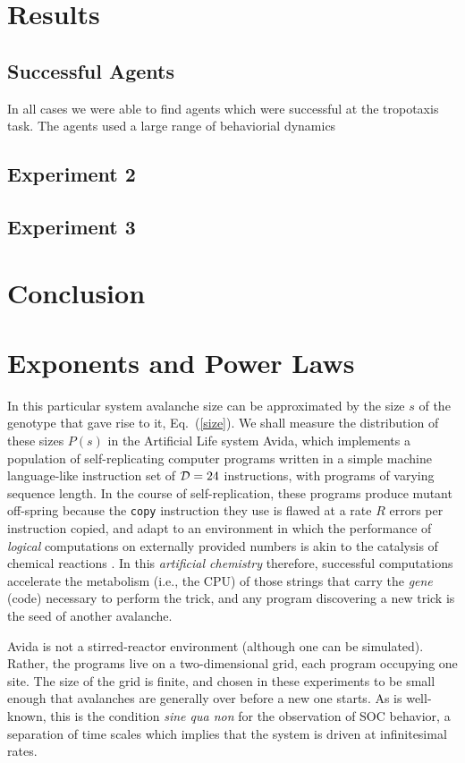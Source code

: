 \documentclass[letterpaper]{article}
\begin{document}
\section{Results}
\subsection{Successful Agents}
In all cases we were able to find agents which were successful at the tropotaxis
task. The agents used a large range of behaviorial dynamics

\subsection{Experiment 2}
\subsection{Experiment 3}

\section{Conclusion}


\section{Exponents and Power Laws}


In this particular system avalanche size can be approximated
by the size $s$ of the genotype that gave rise to it,
Eq.~(\ref{size}).  We shall measure the distribution of these sizes
$P(s)$ in the Artificial Life system Avida, which implements a
population of self-replicating computer programs written in a simple
machine language-like instruction set of ${\cal D}=24$ instructions,
with programs of varying sequence length. In the course of
self-replication, these programs produce mutant off-spring because the
{\tt copy} instruction they use is flawed at a rate $R$ errors per
instruction copied, and adapt to an environment in which the
performance of {\em logical} computations on externally provided
numbers is akin to the catalysis of chemical reactions \citep{OBA}. In
this {\em artificial chemistry} therefore, successful computations
accelerate the metabolism (i.e., the CPU) of those strings that carry
the {\em gene} (code) necessary to perform the trick, and any program
discovering a new trick is the seed of another avalanche.

Avida is not a stirred-reactor environment (although one can be
simulated). Rather, the programs live on a two-dimensional grid, each
program occupying one site. The size of the grid is finite, and chosen
in these experiments to be small enough that avalanches are generally
over before a new one starts. As is well-known, this is the condition
{\em sine qua non} for the observation of SOC behavior, a separation
of time scales which implies that the system is driven at
infinitesimal rates.
\end{document}
